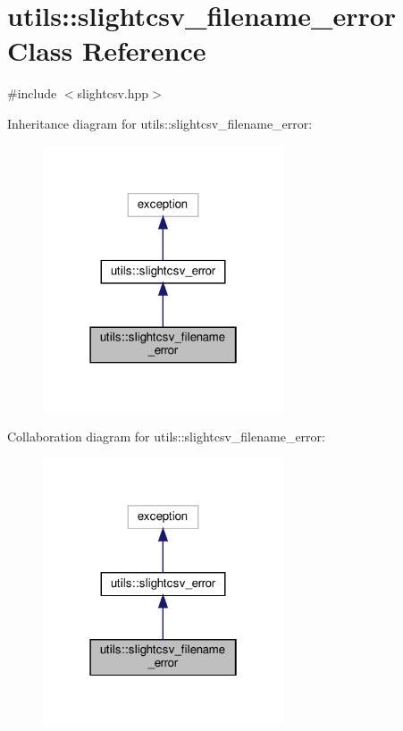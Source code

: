 \hypertarget{classutils_1_1slightcsv__filename__error}{}\section{utils\+:\+:slightcsv\+\_\+filename\+\_\+error Class Reference}
\label{classutils_1_1slightcsv__filename__error}


{\ttfamily \#include $<$slightcsv.\+hpp$>$}



Inheritance diagram for utils\+:\+:slightcsv\+\_\+filename\+\_\+error\+:
\nopagebreak
\begin{figure}[H]
\begin{center}
\leavevmode
\includegraphics[width=202pt]{classutils_1_1slightcsv__filename__error__inherit__graph}
\end{center}
\end{figure}


Collaboration diagram for utils\+:\+:slightcsv\+\_\+filename\+\_\+error\+:
\nopagebreak
\begin{figure}[H]
\begin{center}
\leavevmode
\includegraphics[width=202pt]{classutils_1_1slightcsv__filename__error__coll__graph}
\end{center}
\end{figure}


